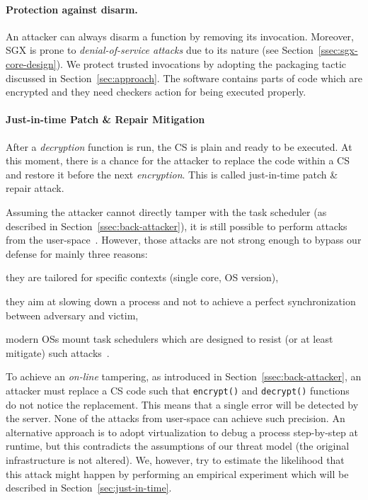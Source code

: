 \paragraph{Protection against disarm.}
An attacker can always disarm a function by removing its invocation.
Moreover, SGX is prone to \emph{denial-of-service attacks} due to its nature 
(see Section~\ref{ssec:sgx-core-design}).
We protect trusted invocations by adopting the packaging tactic discussed in 
Section~\ref{sec:approach}.
The software contains parts of code which are encrypted and they need checkers 
action for being executed properly.

\paragraph{Just-in-time Patch \& Repair Mitigation}

After a \emph{decryption} function is run, the CS is plain and ready to be 
executed.
At this moment, there is a chance for the attacker to replace the code within a 
CS and restore it before the next \emph{encryption}.
This is called just-in-time patch \& repair attack.

Assuming the attacker cannot directly tamper with the task scheduler (as 
described in Section~\ref{ssec:back-attacker}), it is still possible to perform 
attacks from the user-space~\citep{5958048}.
However, those attacks are not strong enough to bypass our defense for mainly 
three reasons:
\begin{enumerate*}[label=(\roman*)]
	\item they are tailored for specific contexts (\eg single core, OS version),
	\item they aim at slowing down a process and not to achieve a perfect 
	synchronization between adversary and victim,
	\item modern OSs mount task schedulers which are designed to resist (or at 
	least mitigate) such attacks~\citep{cfslinux}.
\end{enumerate*}
To achieve an \emph{on-line} tampering, as introduced in 
Section~\ref{ssec:back-attacker}, an attacker must replace a CS code such that 
\texttt{encrypt()} and \texttt{decrypt()} functions do not notice the 
replacement.
This means that a single error will be detected by the server. 
None of the attacks from user-space can achieve such precision.
An alternative approach is to adopt virtualization to debug a process 
step-by-step at runtime, but this contradicts the assumptions of our threat 
model (\ie the original infrastructure is not altered).
We, however, try to estimate the likelihood that this attack might happen by 
performing an empirical experiment which will be described in 
Section~\ref{sec:just-in-time}.


